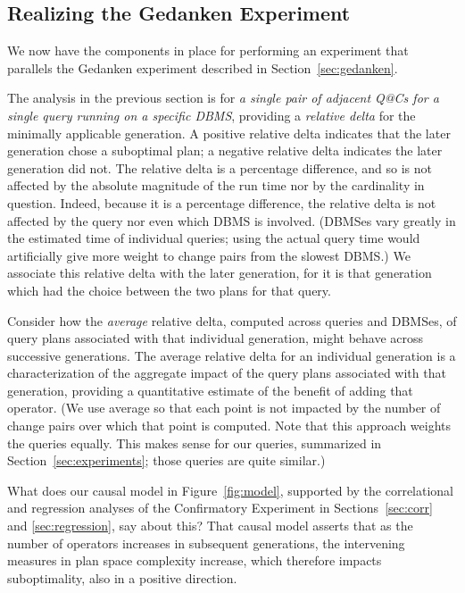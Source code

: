 \documentclass[prodmode,acmtods]{acmsmall}
\begin{document}
\subsection{Realizing the Gedanken Experiment}\label{sec:realizing}
We now have the components in place for performing an experiment that
parallels the Gedanken experiment described in Section~\ref{sec:gedanken}.

The analysis in the previous section is for {\em a single pair of adjacent Q@Cs for a single query
running on a specific \hbox{DBMS}},
providing a {\em relative delta} for the minimally \hbox{applicable} generation. A
positive relative delta indicates that the later generation chose a
suboptimal plan; a negative relative delta indicates the later generation
did not. The relative delta is a percentage difference, and so is not \hbox{affected}
by the absolute magnitude of the run time nor by the cardinality in
question. Indeed, because it is a percentage difference, the relative delta
is not affected by the query nor even which \hbox{DBMS} is involved. (DBMSes
vary greatly in the estimated time of individual queries; using the actual
query time would artificially give more weight to change pairs from the
slowest DBMS.) We associate
this relative delta with the later generation, for it is that generation
which had the choice between the two plans for that query.

Consider how the {\em average} relative delta, computed across queries and
DBMSes, of query plans associated with that individual generation, might
behave across successive generations.
The average relative delta for an individual generation is a characterization of the
aggregate impact of the query plans associated with that generation, providing a quantitative estimate of the benefit
of adding that operator. (We use average so that each point is not impacted
by the number of change pairs over which that point is computed. Note that
this approach weights the queries equally. This makes sense for our queries,
summarized in Section~\ref{sec:experiments}; those queries are quite similar.)

What does our causal model in Figure~\ref{fig:model}, supported by the
correlational and regression analyses of the Confirmatory Experiment in
Sections~\ref{sec:corr} and \ref{sec:regression}, say about this? That
causal model asserts that as the number of operators increases in
subsequent generations, the intervening measures in plan space complexity increase, which
therefore impacts suboptimality, also in a positive direction.
\end{document}
